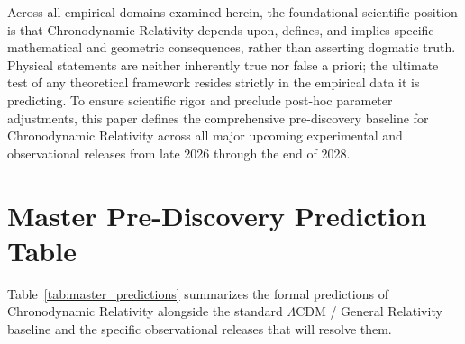 \documentclass[aps,prd,reprint,superscriptaddress,nofootinbib,twocolumn,floatfix]{revtex4-2}
\begin{document}
Across all empirical domains examined herein, the foundational scientific position is that Chronodynamic Relativity depends upon, defines, and implies specific mathematical and geometric consequences, rather than asserting dogmatic truth. Physical statements are neither inherently true nor false a priori; the ultimate test of any theoretical framework resides strictly in the empirical data it is predicting. To ensure scientific rigor and preclude post-hoc parameter adjustments, this paper defines the comprehensive pre-discovery baseline for Chronodynamic Relativity across all major upcoming experimental and observational releases from late 2026 through the end of 2028.

\section{Master Pre-Discovery Prediction Table}
\label{sec:master_table}

Table~\ref{tab:master_predictions} summarizes the formal predictions of Chronodynamic Relativity alongside the standard $\Lambda$CDM / General Relativity baseline and the specific observational releases that will resolve them.
\end{document}
